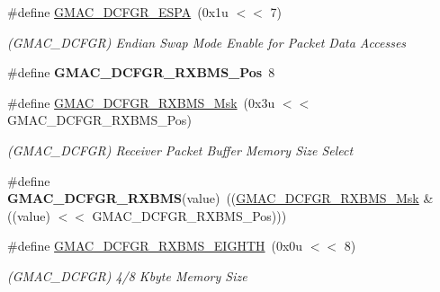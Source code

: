 \begin{DoxyCompactItemize}
\#define \mbox{\hyperlink{group__SAME70__GMAC_ga27eb39d9c03abd7ee291fe0a2a4cf9d7}{G\+M\+A\+C\+\_\+\+D\+C\+F\+G\+R\+\_\+\+E\+S\+PA}}~(0x1u $<$$<$ 7)
\begin{DoxyCompactList}\small\item\em (G\+M\+A\+C\+\_\+\+D\+C\+F\+GR) Endian Swap Mode Enable for Packet Data Accesses \end{DoxyCompactList}\item 
\mbox{\label{group__SAME70__GMAC_ga09adf3c431b3e80acc442b579f979cb5}} 
\#define {\bfseries G\+M\+A\+C\+\_\+\+D\+C\+F\+G\+R\+\_\+\+R\+X\+B\+M\+S\+\_\+\+Pos}~8
\item 
\mbox{\label{group__SAME70__GMAC_gafb3005bef900da397d6acc32ebc641d4}} 
\#define \mbox{\hyperlink{group__SAME70__GMAC_gafb3005bef900da397d6acc32ebc641d4}{G\+M\+A\+C\+\_\+\+D\+C\+F\+G\+R\+\_\+\+R\+X\+B\+M\+S\+\_\+\+Msk}}~(0x3u $<$$<$ G\+M\+A\+C\+\_\+\+D\+C\+F\+G\+R\+\_\+\+R\+X\+B\+M\+S\+\_\+\+Pos)
\begin{DoxyCompactList}\small\item\em (G\+M\+A\+C\+\_\+\+D\+C\+F\+GR) Receiver Packet Buffer Memory Size Select \end{DoxyCompactList}\item 
\mbox{\label{group__SAME70__GMAC_ga444400e6e7bddaa54d53a6a2150a52e9}} 
\#define {\bfseries G\+M\+A\+C\+\_\+\+D\+C\+F\+G\+R\+\_\+\+R\+X\+B\+MS}(value)~((\mbox{\hyperlink{group__SAMV71__GMAC_gafb3005bef900da397d6acc32ebc641d4}{G\+M\+A\+C\+\_\+\+D\+C\+F\+G\+R\+\_\+\+R\+X\+B\+M\+S\+\_\+\+Msk}} \& ((value) $<$$<$ G\+M\+A\+C\+\_\+\+D\+C\+F\+G\+R\+\_\+\+R\+X\+B\+M\+S\+\_\+\+Pos)))
\item 
\mbox{\label{group__SAME70__GMAC_ga2e15d6d5c9c2202b80eddc0894d44053}} 
\#define \mbox{\hyperlink{group__SAME70__GMAC_ga2e15d6d5c9c2202b80eddc0894d44053}{G\+M\+A\+C\+\_\+\+D\+C\+F\+G\+R\+\_\+\+R\+X\+B\+M\+S\+\_\+\+E\+I\+G\+H\+TH}}~(0x0u $<$$<$ 8)
\begin{DoxyCompactList}\small\item\em (G\+M\+A\+C\+\_\+\+D\+C\+F\+GR) 4/8 Kbyte Memory Size \end{DoxyCompactList}\item 
\mbox{\label{group__SAME70__GMAC_gafba34868045ec08fa21e3e99c91edb6f}} 

\end{DoxyCompactItemize}
